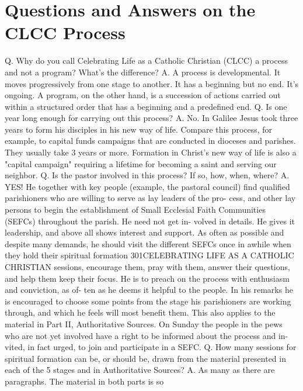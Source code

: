 \documentclass[oneside]{book}
\begin{document}

\chapter{Questions and Answers on the CLCC Process}

Q. Why do you call Celebrating Life as a Catholic Christian (CLCC) a process and
not a program? What's the difference?  A. A process is developmental. It moves
progressively from one stage to another. It has a beginning but no end. It's
ongoing. A program, on the other hand, is a succession of actions carried out
within a structured order that has a beginning and a predefined end.  Q. Is one
year long enough for carrying out this process?  A. No. In Galilee Jesus took
three years to form his disciples in his new way of life. Compare this process,
for example, to capital funds campaigns that are conducted in dioceses and
parishes. They usually take 3 years or more. Formation in Christ's new way of
life is also a "capital campaign" requiring a lifetime for becoming a saint and
serving our neighbor.  Q. Is the pastor involved in this process? If so, how,
when, where?  A. YES! He together with key people (example, the pastoral
council) find qualified parishioners who are willing to serve as lay leaders of
the pro- cess, and other lay persons to begin the establishment of Small
Ecclesial Faith Communities (SEFCs) throughout the parish. He need not get in-
volved in details. He gives it leadership, and above all shows interest and
support.  As often as possible and despite many demands, he should visit the
different SEFCs once in awhile when they hold their spiritual formation
301CELEBRATING LIFE AS A CATHOLIC CHRISTIAN sessions, encourage them, pray with
them, answer their questions, and help them keep their focus.  He is to preach
on the process with enthusiasm and conviction, as of- ten as he deems it helpful
to the people. In his remarks he is encouraged to choose some points from the
stage his parishioners are working through, and which he feels will most benefit
them. This also applies to the material in Part II, Authoritative Sources. On
Sunday the people in the pews who are not yet involved have a right to be
informed about the process and in- vited, in fact urged, to join and participate
in a SEFC.  Q. How many sessions for spiritual formation can be, or should be,
drawn from the material presented in each of the 5 stages and in Authoritative
Sources?  A. As many as there are paragraphs. The material in both parts is so
\end{document}
